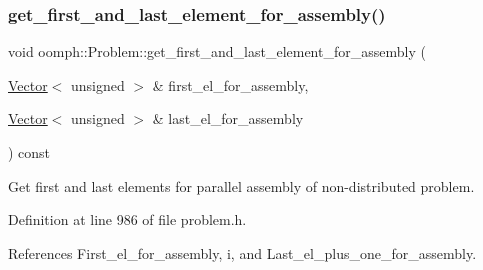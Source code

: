 \subsubsection{\texorpdfstring{get\+\_\+first\+\_\+and\+\_\+last\+\_\+element\+\_\+for\+\_\+assembly()}{get\_first\_and\_last\_element\_for\_assembly()}}
{\footnotesize\ttfamily void oomph\+::\+Problem\+::get\+\_\+first\+\_\+and\+\_\+last\+\_\+element\+\_\+for\+\_\+assembly (\begin{DoxyParamCaption}\item[{\hyperlink{classoomph_1_1Vector}{Vector}$<$ unsigned $>$ \&}]{first\+\_\+el\+\_\+for\+\_\+assembly,  }\item[{\hyperlink{classoomph_1_1Vector}{Vector}$<$ unsigned $>$ \&}]{last\+\_\+el\+\_\+for\+\_\+assembly }\end{DoxyParamCaption}) const\hspace{0.3cm}{\ttfamily [inline]}}



Get first and last elements for parallel assembly of non-\/distributed problem. 



Definition at line 986 of file problem.\+h.



References First\+\_\+el\+\_\+for\+\_\+assembly, i, and Last\+\_\+el\+\_\+plus\+\_\+one\+\_\+for\+\_\+assembly.

\mbox{\label{classoomph_1_1Problem_a09788e9f690067496b6621fae12ba354}} 
